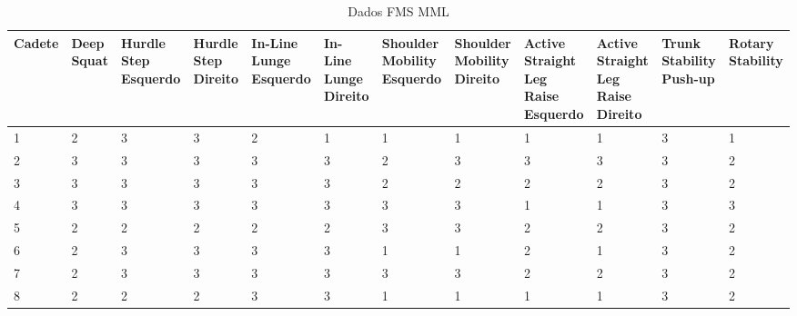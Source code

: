 \begin{landscape}
    
    \begin{table}[h]
        \centering
        \caption{Dados FMS \acrlong{MML}}
        \renewcommand{\arraystretch}{1.3}  %
        \begin{adjustbox}{scale=0.9}
        \begin{tabular}{|p{1.8cm}|p{1.6cm}|p{1.6cm}|p{1.6cm}|p{1.6cm}|p{1.6cm}|p{1.6cm}|p{1.6cm}|p{1.6cm}|p{1.6cm}|p{1.6cm}|p{1.6cm}|}
            \hline
            \textbf{Cadete} & \textbf{Deep Squat} & \textbf{Hurdle Step Esquerdo} & \textbf{Hurdle Step Direito} & \textbf{In-Line Lunge Esquerdo} & \textbf{In-Line Lunge Direito} & \textbf{Shoulder Mobility Esquerdo} & \textbf{Shoulder Mobility Direito} & \textbf{Active Straight Leg Raise Esquerdo} & \textbf{Active Straight Leg Raise Direito} & \textbf{Trunk Stability Push-up} & \textbf{Rotary Stability} \\
            \hline
            1 & 2 & 3 & 3 & 2 & 1 & 1 & 1 & 1 & 1 & 3 & 1 \\
            2 & 3 & 3 & 3 & 3 & 3 & 2 & 3 & 3 & 3 & 3 & 2 \\
            3 & 3 & 3 & 3 & 3 & 3 & 2 & 2 & 2 & 2 & 3 & 2 \\
            4 & 3 & 3 & 3 & 3 & 3 & 3 & 3 & 1 & 1 & 3 & 3 \\
            5 & 2 & 2 & 2 & 2 & 2 & 3 & 3 & 2 & 2 & 3 & 2 \\
            6 & 2 & 3 & 3 & 3 & 3 & 1 & 1 & 2 & 1 & 3 & 2 \\
            7 & 2 & 3 & 3 & 3 & 3 & 3 & 3 & 2 & 2 & 3 & 2 \\
            8 & 2 & 2 & 2 & 3 & 3 & 1 & 1 & 1 & 1 & 3 & 2 \\
            \hline
        \end{tabular}
        \end{adjustbox}
    \end{table}
    
    

\end{landscape}